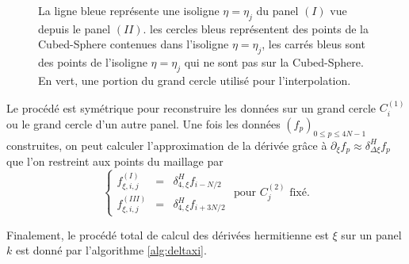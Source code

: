 \begin{figure}[htbp]
\begin{center}
\end{center}
\caption{La ligne bleue représente une isoligne $\eta=\eta_j$ du panel $(I)$ vue depuis le panel $(II)$. les cercles bleus représentent des points de la Cubed-Sphere contenues dans l'isoligne $\eta=\eta_j$, les carrés bleus sont des points de l'isoligne $\eta=\eta_j$ qui ne sont pas sur la Cubed-Sphere. En vert, une portion du grand cercle utilisé pour l'interpolation.}
\label{fig: panel II_interp2}
\end{figure}  

Le procédé est symétrique pour reconstruire les données sur un grand cercle $C_i^{(1)}$ ou le grand cercle d'un autre panel.
Une fois les données $(f_p)_{0 \leq p \leq 4N-1}$ construites, on peut calculer l'approximation de la dérivée grâce à $\partial_{\xi} f_p \approx \delta_{\Delta \xi}^H f_p$
que l'on restreint aux points du maillage par 
\begin{equation}
\left\lbrace
\begin{array}{rcl}
f_{\xi,i,j}^{(I)} & = & \delta_{4, \xi}^H f_{i-N/2}\\
f_{\xi,i,j}^{(III)} & = & \delta_{4, \xi}^H f_{i+3N/2}
\end{array}
\right.
\text{ pour } C^{(2)}_j \text{ fixé.}
\end{equation}

Finalement, le procédé total de calcul des dérivées hermitienne est $\xi$ sur un panel $k$ est donné par l'algorithme \ref{alg:deltaxi}.

